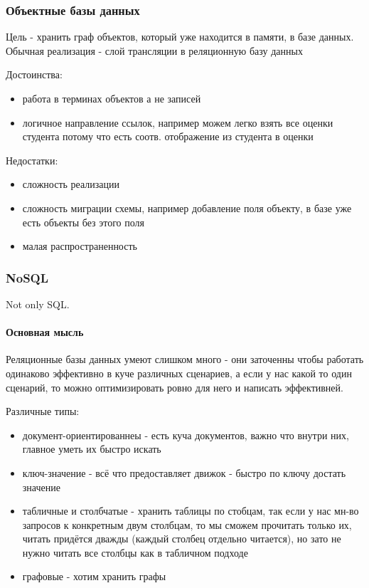 \subsubsection{Объектные базы данных}
Цель - хранить граф объектов, который уже находится в памяти, в базе данных. Обычная реализация - слой трансляции в реляционную базу данных

\enewline

Достоинства:
\begin{itemize}
	\item работа в терминах объектов а не записей
	\item логичное направление ссылок, например можем легко взять все оценки студента потому что есть соотв. отображение из студента в оценки
\end{itemize}

Недостатки:
\begin{itemize}
	\item сложность реализации
	\item сложность миграции схемы, например добавление поля объекту, в базе уже есть объекты без этого поля
	\item малая распространенность
\end{itemize}

\subsubsection{NoSQL}
Not only SQL. \\ \paragraph{Основная мысль} Реляционные базы данных умеют слишком много - они заточенны чтобы работать одинаково эффективно в куче различных сценариев, а если у нас какой то один сценарий, то можно оптимизировать ровно для него и написать эффективней.

\enewline

Различные типы:
\begin{itemize}
	\item  документ-ориентированнеы - есть куча документов, важно что внутри них, главное уметь их быстро искать
	\item ключ-значение - всё что предоставляет движок - быстро по ключу достать значение
	\item табличные и столбчатые - хранить таблицы по стобцам, так если у нас мн-во запросов к конкретным двум столбцам, то мы сможем прочитать только их, читать придётся дважды (каждый столбец отдельно читается), но зато не нужно читать все столбцы как в табличном подходе
	\item графовые - хотим хранить графы
\end{itemize}

